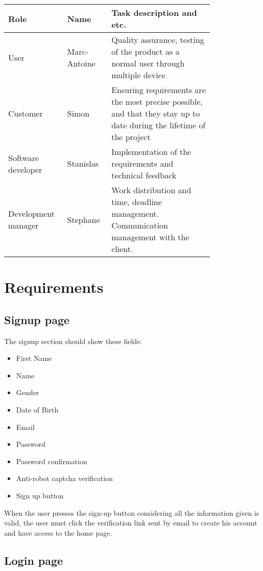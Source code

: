 \documentclass[conference]{IEEEtran}
\begin{document}
\begin{tabular}{ |p{0.2\linewidth}|p{0.15\linewidth}|p{0.45\linewidth}| }
\hline
Role & Name & Task description and etc. \\
\hline
User & Marc-Antoine & Quality assurance, testing of the product as a normal user through multiple device \\
\hline
Customer & Simon & Ensuring requirements are the most precise possible, and that they stay up to date during the lifetime of the project \\
\hline
Software developer & Stanislas & Implementation of the requirements and technical feedback \\
\hline
Development manager & Stephane & Work distribution and time, deadline management. Communication management with the client. \\
\hline
\end{tabular}

\section{Requirements}

\subsection{Signup page}

The signup section should show these fields:

\begin{itemize}
    \item First Name
    \item Name
    \item Gender
    \item Date of Birth
    \item Email
    \item Password
    \item Password confirmation
    \item Anti-robot captcha verification
    \item Sign up button
\end{itemize}

When the user presses the sign-up button considering all
the information given is valid, the user must click the verification link sent by email to create his account and have access to the home page.

\subsection{Login page}
\end{document}
